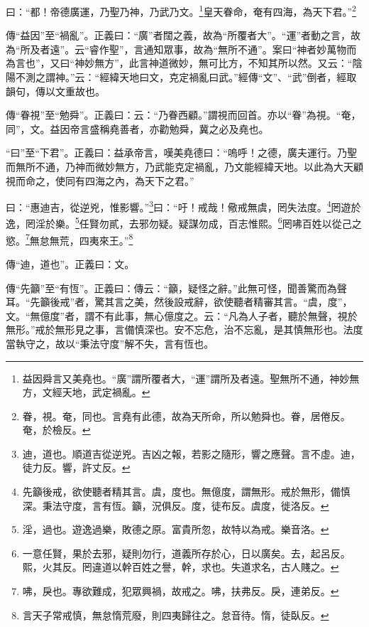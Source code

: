 曰：“都！帝德廣運，乃聖乃神，乃武乃文。\footnote{益因舜言又美堯也。“廣”謂所覆者大，“運”謂所及者遠。聖無所不通，神妙無方，文經天地，武定禍亂。}皇天眷命，奄有四海，為天下君。”\footnote{眷，視。奄，同也。言堯有此德，故為天所命，所以勉舜也。眷，居倦反。奄，於檢反。}

{\noindent\zhuan{}\fzbyks 傳“益因”至“禍亂”。正義曰：“廣”者闊之義，故為“所覆者大”。“運”者動之言，故為“所及者遠”。云“睿作聖”，言通知眾事，故為“無所不通”。案曰“神者妙萬物而為言也”，又曰“神妙無方”，此言神道微妙，無可比方，不知其所以然。又云：“陰陽不測之謂神。”云：“經緯天地曰文，克定禍亂曰武。”經傳“文”、“武”倒者，經取韻句，傳以文重故也。 \par}

{\noindent\zhuan{}\fzbyks 傳“眷視”至“勉舜”。正義曰：云：“乃眷西顧。”謂視而回首。亦以“眷”為視。“奄，同”，文。益因帝言盛稱堯善者，亦勸勉舜，冀之必及堯也。 \par}

{\noindent\shu{}\fzkt “曰”至“下君”。正義曰：益承帝言，嘆美堯德曰：“嗚呼！之德，廣夫運行。乃聖而無所不通，乃神而微妙無方，乃武能克定禍亂，乃文能經緯天地。以此為大天顧視而命之，使同有四海之內，為天下之君。” \par}

曰：“惠迪吉，從逆兇，惟影響。”\footnote{迪，道也。順道吉從逆兇。吉凶之報，若影之隨形，響之應聲。言不虛。迪，徒力反。響，許丈反。}曰：“吁！戒哉！儆戒無虞，罔失法度。\footnote{先籲後戒，欲使聽者精其言。虞，度也。無億度，謂無形。戒於無形，備慎深。秉法守度，言有恆。籲，況俱反。度，徒布反。虞度，徙洛反。}罔遊於逸，罔淫於樂。\footnote{淫，過也。遊逸過樂，敗德之原。富貴所忽，故特以為戒。樂音洛。}任賢勿貳，去邪勿疑。疑謀勿成，百志惟熙。\footnote{一意任賢，果於去邪，疑則勿行，道義所存於心，日以廣矣。去，起呂反。熙，火其反。罔違道以幹百姓之譽，幹，求也。失道求名，古人賤之。}罔咈百姓以從己之慾。\footnote{咈，戾也。專欲難成，犯眾興禍，故戒之。咈，扶弗反。戾，連弟反。}無怠無荒，四夷來王。”\footnote{言天子常戒慎，無怠惰荒廢，則四夷歸往之。怠音待。惰，徒臥反。}

{\noindent\zhuan{}\fzbyks 傳“迪，道也”。正義曰：文。 \par}

{\noindent\zhuan{}\fzbyks 傳“先籲”至“有恆”。正義曰：傳云：“籲，疑怪之辭。”此無可怪，聞善驚而為聲耳。“先籲後戒”者，驚其言之美，然後設戒辭，欲使聽者精審其言。“虞，度”，文。“無億度”者，謂不有此事，無心億度之。云：“凡為人子者，聽於無聲，視於無形。”戒於無形見之事，言備慎深也。安不忘危，治不忘亂，是其慎無形也。法度當執守之，故以“秉法守度”解不失，言有恆也。 \par}

